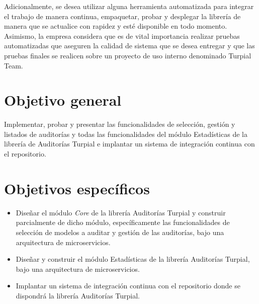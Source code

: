 Adicionalmente, se desea utilizar alguna herramienta automatizada para integrar
el trabajo de manera continua, empaquetar, probar y desplegar la librería de
manera que se actualice con rapidez y esté disponible en todo momento.
Asimismo, la empresa considera que es de vital importancia realizar pruebas
automatizadas que aseguren la calidad de sistema que se desea entregar y que
las pruebas finales se realicen sobre un proyecto de uso interno denominado
Turpial Team.

\section{Objetivo general}

Implementar, probar y presentar las funcionalidades de selección, gestión y
listados de auditorías y todas las funcionalidades del módulo Estadísticas de
la librería de Auditorías Turpial e implantar un sistema de integración
continua con el repositorio.

\section{Objetivos específicos}

\begin{itemize}
    \item Diseñar el módulo \textit{Core} de la librería Auditorías Turpial y construir parcialmente de dicho módulo, específicamente las funcionalidades de selección de modelos a auditar y gestión de las auditorías, bajo una arquitectura de microservicios.
    \item Diseñar y construir el módulo Estadísticas de la librería Auditorías Turpial, bajo una arquitectura de microservicios.
    \item Implantar un sistema de integración continua con el repositorio donde se dispondrá la librería Auditorías Turpial.
\end{itemize}